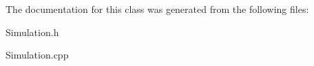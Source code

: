 The documentation for this class was generated from the following files\+:\begin{DoxyCompactItemize}
\item 
Simulation.\+h\item 
Simulation.\+cpp\end{DoxyCompactItemize}
